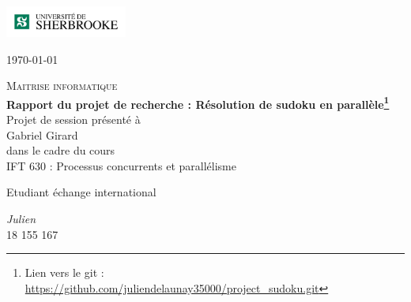 \documentclass[12pt]{article}
\begin{document}
\begin{titlepage}
 
 
\begin{minipage}{0.5\textwidth}
\begin{flushleft}
 	\includegraphics[width=0.3\textwidth]{./universite.png}\\
\end{flushleft}
\end{minipage}
\begin{minipage}{0.4\textwidth}
\begin{flushright} 
	{\large \today}
\end{flushright}
\end{minipage}
  
\begin{center}
 
 
 
\textsc{\LARGE Maitrise informatique}\\[1cm]
 
  
{\huge \bfseries Rapport du projet de recherche : 
Résolution de sudoku en parallèle\footnote{ Lien vers le git : \url{https://github.com/juliendelaunay35000/project_sudoku.git}}\newline \newline}\\


{Projet de session présenté à\\
Gabriel Girard\\
dans le cadre du cours\\
IFT 630 : Processus concurrents et parallélisme}
\end{center}

\vfill
\begin{minipage}{0.5\textwidth}
\begin{flushleft}
\begin{small}Etudiant échange international\\

\underline{}\end{small}
\end{flushleft}
\end{minipage}
\begin{minipage}{0.4\textwidth}
\begin{flushright}
 
\begin{small} \emph{Julien  } \\18 155 167
\underline{}\end{small}
\end{flushright}
\end{minipage}\end{titlepage} 
 
\end{document}
